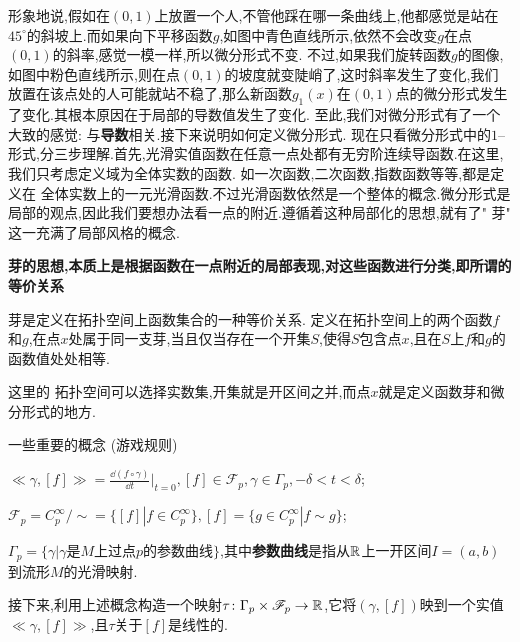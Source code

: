 形象地说,假如在$(0,1)$上放置一个人,不管他踩在哪一条曲线上,他都感觉是站在$45^\circ$的斜坡上.而如果向下平移函数$g$,如图中青色直线所示,依然不会改变$g$在点$(0,1)$的斜率,感觉一模一样,所以微分形式不变.
不过,如果我们旋转函数$g$的图像,如图中粉色直线所示,则在点$(0,1)$的坡度就变陡峭了,这时斜率发生了变化,我们放置在该点处的人可能就站不稳了,那么新函数$g_1(x)$在$(0,1)$点的微分形式发生了变化.其根本原因在于局部的导数值发生了变化.
至此,我们对微分形式有了一个大致的感觉: 与\textbf{导数}相关.接下来说明如何定义微分形式.
现在只看微分形式中的$1$--形式,分三步理解.首先,光滑实值函数在任意一点处都有无穷阶连续导函数.在这里,我们只考虑定义域为全体实数的函数. 如一次函数,二次函数,指数函数等等,都是定义在
全体实数上的一元光滑函数.不过光滑函数依然是一个整体的概念.微分形式是局部的观点,因此我们要想办法看一点的附近.遵循着这种局部化的思想,就有了" 芽"
这一充满了局部风格的概念.

\textbf{芽的思想,本质上是根据函数在一点附近的局部表现,对这些函数进行分类,即所谓的等价关系}
\begin{definition}[][芽][def:芽]
    芽是定义在拓扑空间上函数集合的一种等价关系.
    定义在拓扑空间上的两个函数$f$和$g$,在点$x$处属于同一支芽,当且仅当存在一个开集$S$,使得$S$包含点$x$,且在$S$上$f$和$g$的函数值处处相等.
\end{definition}
这里的 拓扑空间可以选择实数集,开集就是开区间之并,而点$x$就是定义函数芽和微分形式的地方.

一些重要的概念 (游戏规则)

$\ll \gamma,[f]\gg =\frac{\dd (f\circ \gamma)}{\dd t}\Bigg|_{t=0},[f]\in \mathscr{F}_p,\gamma\in \Gamma_p,-\delta< t< \delta$;

$\mathscr{F}_p=C_p^\infty/\sim=\{[f]|f\in C_p^\infty\},[f]=\{g\in C_p^\infty|f\sim g\}$;

$\Gamma_p=\{\gamma |\gamma\text{是$M$上过点$p$的参数曲线}\}$,其中\textbf{参数曲线}是指从$\mathbb{R}$上一开区间$I=(a,b)$到流形$M$的光滑映射.

接下来,利用上述概念构造一个映射$\tau\colon \Gamma_p \times \mathscr{F}_p\to \mathbb{R}$,它将$(\gamma,[f])$映到一个实值$\ll \gamma,[f]\gg$,且$\tau$关于$[f]$是线性的.

